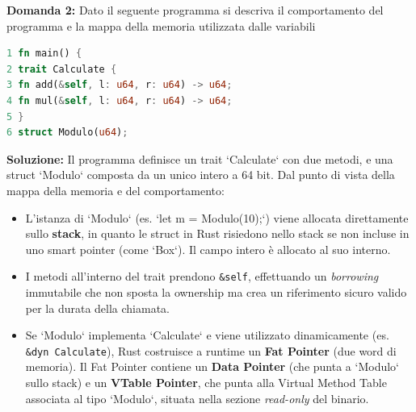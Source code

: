 \begin{exambox}
\textbf{Domanda 2:} Dato il seguente programma si descriva il comportamento del programma e la mappa della memoria utilizzata dalle variabili
\begin{lstlisting}[language=Rust]
1 fn main() {
2 trait Calculate {
3 fn add(&self, l: u64, r: u64) -> u64;
4 fn mul(&self, l: u64, r: u64) -> u64;
5 }
6 struct Modulo(u64);
\end{lstlisting}

\textbf{Soluzione:}
Il programma definisce un trait `Calculate` con due metodi, e una struct `Modulo` composta da un unico intero a 64 bit. Dal punto di vista della mappa della memoria e del comportamento:
\begin{itemize}
    \item L'istanza di `Modulo` (es. `let m = Modulo(10);`) viene allocata direttamente sullo \textbf{stack}, in quanto le struct in Rust risiedono nello stack se non incluse in uno smart pointer (come `Box`). Il campo intero è allocato al suo interno.
    \item I metodi all'interno del trait prendono \texttt{\&self}, effettuando un \textit{borrowing} immutabile che non sposta la ownership ma crea un riferimento sicuro valido per la durata della chiamata.
    \item Se `Modulo` implementa `Calculate` e viene utilizzato dinamicamente (es. \texttt{\&dyn Calculate}), Rust costruisce a runtime un \textbf{Fat Pointer} (due word di memoria). Il Fat Pointer contiene un \textbf{Data Pointer} (che punta a `Modulo` sullo stack) e un \textbf{VTable Pointer}, che punta alla Virtual Method Table associata al tipo `Modulo`, situata nella sezione \textit{read-only} del binario.
\end{itemize}
\end{exambox}

